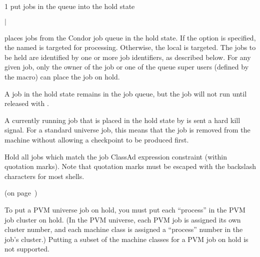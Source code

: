 \begin{ManPage}{\label{man-condor-hold}}{1}
{put jobs in the queue into the hold state}
\Synopsis {}
\ToolArgsBase

\ToolDebugOption
\ToolLocate 
\ToolJobs
$|$  \Dots 

\ToolDebugOption
\ToolLocate 
\ToolAll


\Description

 places jobs from the Condor job queue in
the hold state.
If the  option is specified, the named  is targeted
for processing.  
Otherwise, the local  is targeted.
The jobs to be held are identified by one or more job identifiers, as
described below.
For any given job, only the owner of the job or one of the queue super users
(defined by the  macro) can place the job on hold.

A job in the hold state remains in the job queue,
but the job will not run until released with .

A currently running job that is placed in the hold state by 
is sent a hard kill signal.
For a standard universe job,
this means that the job is removed from the machine without
allowing a checkpoint to be produced first.

\begin{Options}

	\ToolArgsBaseDesc
	\ToolLocateDesc
	\ToolDebugDesc
         {Hold all jobs which match
	        the job ClassAd expression constraint (within quotation
		marks).
		Note that quotation marks must be escaped with the
		backslash characters for most shells.  }

\end{Options}

\SeeAlso
{} (on page~\pageref{man-condor-release})

\GenRem

To put a PVM universe job on hold, you must put each ``process'' in
the PVM job cluster on hold.  (In the PVM universe, each PVM job is
assigned its own cluster number, and each machine class is assigned a
``process'' number in the job's cluster.)  Putting a subset of the
machine classes for a PVM job on hold is not supported.


\end{ManPage}
